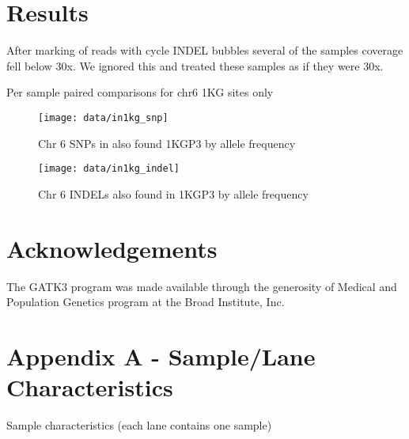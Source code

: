 \documentclass{article}
\begin{document}
  \section{Results}
  After marking of reads with cycle INDEL bubbles several of the samples
  coverage fell below 30x. We ignored this and treated these samples as if they
  were 30x.
  \begin{table}[!h]
    \begin{center}
      \label{psc_table}
      \caption{Per sample paired comparisons for chr6 1KG sites only}
    \end{center}
  \end{table}

  \begin{figure}
    \caption{Chr 6 SNPs in also found 1KGP3 by allele frequency}
    \texttt{[image: data/in1kg\_snp]}
  \end{figure}
  \begin{figure}
    \caption{Chr 6 INDELs also found in 1KGP3 by allele frequency}
    \texttt{[image: data/in1kg\_indel]}
  \end{figure}

  \section{Acknowledgements}
  The GATK3 program was made available through the generosity of Medical and
  Population Genetics program at the Broad Institute, Inc.

  \newpage
  \section{Appendix A - Sample/Lane Characteristics}
  \begin{table}[!h]
    \begin{center}
      \label{sample_table}
      \caption{Sample characteristics (each lane contains one sample)}
    \end{center}
  \end{table}
\end{document}

